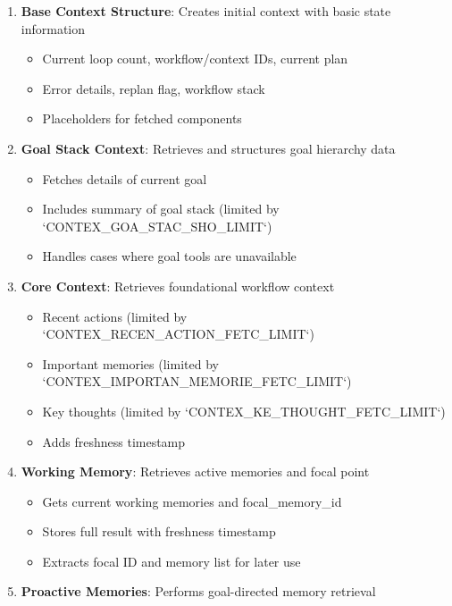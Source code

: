 \documentclass[12pt,a4paper]{article}
\begin{document}
\begin{enumerate}[label=\arabic*.]
    \item \textbf{Base Context Structure}: Creates initial context with basic state information
    \begin{itemize}
        \item Current loop count, workflow/context IDs, current plan
        \item Error details, replan flag, workflow stack
        \item Placeholders for fetched components
    \end{itemize}
    \item \textbf{Goal Stack Context}: Retrieves and structures goal hierarchy data
    \begin{itemize}
        \item Fetches details of current goal
        \item Includes summary of goal stack (limited by `CONTEX\1\_GOA\1\_STAC\1\_SHO\1\_LIMIT`)
        \item Handles cases where goal tools are unavailable
    \end{itemize}
    \item \textbf{Core Context}: Retrieves foundational workflow context
    \begin{itemize}
        \item Recent actions (limited by `CONTEX\1\_RECEN\1\_ACTION\1\_FETC\1\_LIMIT`)
        \item Important memories (limited by `CONTEX\1\_IMPORTAN\1\_MEMORIE\1\_FETC\1\_LIMIT`)
        \item Key thoughts (limited by `CONTEX\1\_KE\1\_THOUGHT\1\_FETC\1\_LIMIT`)
        \item Adds freshness timestamp
    \end{itemize}
    \item \textbf{Working Memory}: Retrieves active memories and focal point
    \begin{itemize}
        \item Gets current working memories and focal\_memory\_id
        \item Stores full result with freshness timestamp
        \item Extracts focal ID and memory list for later use
    \end{itemize}
    \item \textbf{Proactive Memories}: Performs goal-directed memory retrieval
    \begin{itemize}

\end{itemize}
\end{enumerate}
\end{document}
